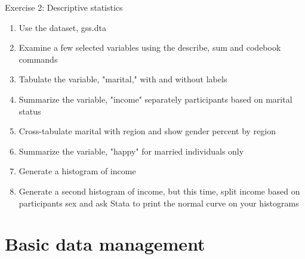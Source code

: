 \documentclass[table,smaller]{beamer}
\begin{document}
\begin{frame}[label=sec-3-4]{Exercise 2: Descriptive statistics}
\begin{enumerate}
\item Use the dataset, gss.dta
\item Examine a few selected variables using the describe, sum and codebook commands
\item Tabulate the variable, "marital," with and without labels
\item Summarize the variable, "income" separately participants based on marital status
\item Cross-tabulate marital with region and show gender percent by region
\item Summarize the variable, "happy" for married individuals only
\item Generate a histogram of income
\item Generate a second histogram of income, but this time, split income based on participants sex and ask Stata to print the normal curve on your histograms
\end{enumerate}
\end{frame}

\section{Basic data management}
\label{sec-4}
\end{document}
